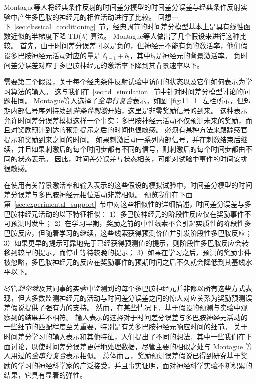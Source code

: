 Montague\cite{montague1996framework}等人将经典条件反射的时间差分模型的时间差分误差与经典条件反射实验中产生多巴胺的神经元的相位活动进行了比较。
回想一下~\ref{sec:classical_conditioning}~节，经典调节的时间差分模型基本上是具有线性函数近似的半梯度下降 TD($ \lambda $) 算法。
Montague等人做出了几个假设来进行这种比较。
首先，由于时间差分误差可以是负的，但神经元不能有负的激活率，他们假设多巴胺神经元活动对应的量是 $ \delta_{t-1} + b_t $，其中$ b_t $是神经元的背景激活率。
负时间差分误差对应于多巴胺神经元的激活率下降到其背景速率以下。



需要第二个假设，关于每个经典条件反射试验中访问的状态以及它们如何表示为学习算法的输入。
这与我们在~\ref{sec:td_simulation}~节中针对时间差分模型讨论的问题相同。 
Montague等人选择了\textit{全串行复合}表示，如图~\ref{fig:11_1}~左栏所示，但短期内部信号序列持续到\textit{非条件刺激}开始，这里是非零奖励信号的到来。
这种表示允许时间差分误差模拟这样一个事实：多巴胺神经元活动不仅预测未来的奖励，而且对奖励预计到达的预测提示之后的时间也很敏感。
必须有某种方法来跟踪感官提示和奖励到来之间的时间。
如果刺激启动一系列内部信号，并在刺激结束后继续，并且如果刺激后的每个时间步都有不同的信号，则刺激后的每个时间步都由不同的状态表示。
因此，时间差分误差与状态相关，可能对试验中事件的时间安排很敏感。


在使用有关背景激活率和输入表示的这些假设的模拟试验中，时间差分模型的时间差分误差与多巴胺神经元相位活动非常相似。
预览我们在下面第~\ref{sec:experimental_support}~节中对这些相似性的详细描述，时间差分误差与多巴胺神经元活动的以下特征相似：
1）多巴胺神经元的阶段性反应仅在奖励事件不可预测时发生；
2）在学习早期，奖励之前的中性线索不会引起实质性的阶段性多巴胺反应，但随着学习的继续，这些线索获得预测价值并引发阶段性多巴胺反应；
3）如果更早的提示可靠地先于已经获得预测值的提示，则阶段性多巴胺反应会转移到较早的提示，而停止等待较晚的提示；
3）如果在学习之后，预测的奖励事件被忽略，多巴胺神经元的反应在奖励事件的预期时间之后不久就会降低到其基线水平以下。


尽管\textit{舒尔茨}及其同事的实验中监测到的每个多巴胺神经元并非都以所有这些方式表现，但大多数监测神经元的活动与时间差分误差之间的惊人对应关系为奖励预测误差假说提供了强有力的支持。
然而，在某些情况下，基于假设的预测与实验中观察到的结果并不相符。
输入表示的选择对于时间差分误差与多巴胺神经元活动的一些细节的匹配程度至关重要，特别是有关多巴胺神经元响应时间的细节。
关于时间差分学习的输入表示和其他特征，人们提出了不同的想法，其中一些我们在下面讨论，以使时间差分误差更好地处理数据，尽管主要的相似之处与 Montague 等人用过的\textit{全串行复合}表示相似。
总体而言，奖励预测误差假说已得到研究基于奖励的学习的神经科学家的广泛接受，并且事实证明，面对神经科学实验不断积累的结果，它具有显着的弹性。


